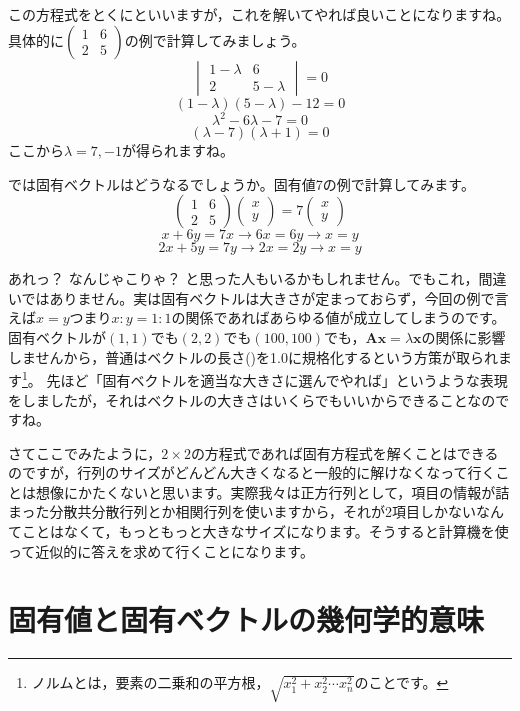 \documentclass{ltjsbook}
\begin{document}
この方程式をとくにといいますが，これを解いてやれば良いことになりますね。具体的に$\begin{pmatrix}1&6\\2&5\end{pmatrix}$の例で計算してみましょう。
\[ \begin{vmatrix}1-\lambda & 6 \\ 2 & 5-\lambda\end{vmatrix}=0\]
\[ (1-\lambda)(5-\lambda) - 12 = 0 \]
\[ \lambda^2 - 6\lambda -7 = 0 \]
\[ (\lambda-7)(\lambda+1)=0\]
ここから$\lambda=7,-1$が得られますね。

では固有ベクトルはどうなるでしょうか。固有値7の例で計算してみます。
\[ \begin{pmatrix} 1 & 6 \\ 2 & 5 \end{pmatrix}\begin{pmatrix} x\\y\end{pmatrix} = 7 \begin{pmatrix} x\\y\end{pmatrix} \]
\[ x + 6y = 7x \to 6x = 6y \to x=y \]
\[ 2x+5y = 7y \to 2x = 2y \to x=y \]

あれっ？ なんじゃこりゃ？ と思った人もいるかもしれません。でもこれ，間違いではありません。実は固有ベクトルは大きさが定まっておらず，今回の例で言えば$x=y$つまり$x:y=1:1$の関係であればあらゆる値が成立してしまうのです。
固有ベクトルが$(1,1)$でも$(2,2)$でも$(100,100)$でも，$\bm{Ax}=\lambda \bm{x}$の関係に影響しませんから，普通はベクトルの長さ()を1.0に規格化するという方策が取られます\footnote{ノルムとは，要素の二乗和の平方根，$\sqrt{x_1^2 + x_2^2 \cdots x_n^2}$のことです。}。
先ほど「固有ベクトルを適当な大きさに選んでやれば」というような表現をしましたが，それはベクトルの大きさはいくらでもいいからできることなのですね。

さてここでみたように，$2\times2$の方程式であれば固有方程式を解くことはできるのですが，行列のサイズがどんどん大きくなると一般的に解けなくなって行くことは想像にかたくないと思います。実際我々は正方行列として，項目の情報が詰まった分散共分散行列とか相関行列を使いますから，それが2項目しかないなんてことはなくて，もっともっと大きなサイズになります。そうすると計算機を使って近似的に答えを求めて行くことになります。

\section{固有値と固有ベクトルの幾何学的意味}
\end{document}
